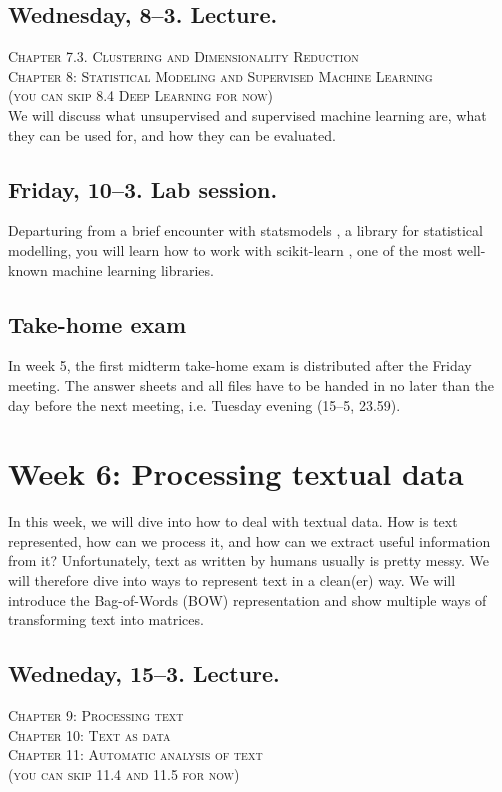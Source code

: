 \subsection*{Wednesday, 8--3. Lecture.}

\textsc{ Chapter 7.3. Clustering and Dimensionality Reduction}\\
\textsc{ Chapter 8: Statistical Modeling and Supervised Machine Learning}\\
\textsc{ (you can skip 8.4 Deep Learning for now)}\\

We will discuss what unsupervised and supervised machine learning are, what they can be used for, and how they can be evaluated.

\subsection*{Friday, 10--3. Lab session.}
Departuring from a brief encounter with statsmodels \citep{statsmodels}, a library for statistical modelling, you will learn how to work with scikit-learn \citep{scikit-learn}, one of the most well-known machine learning libraries.

\subsection*{Take-home exam}
In week 5, the first midterm take-home exam is distributed after the Friday meeting. The answer sheets and all files have to be handed in no later than the day before the next meeting, i.e. Tuesday evening (15--5, 23.59).





\section*{Week 6: Processing textual data}
In this week, we will dive into how to deal with textual data. How is text represented, how can we process it, and how can we extract useful information from it?
Unfortunately, text as written by humans usually is pretty messy.  We will therefore dive  into ways to represent text in a clean(er) way. We will introduce the Bag-of-Words (BOW) representation and show multiple ways of transforming text into matrices.


\subsection*{Wedneday, 15--3. Lecture.}
\textsc{ Chapter 9: Processing text}\\
\textsc{ Chapter 10: Text as data}\\
\textsc{ Chapter 11: Automatic analysis of text}\\
\textsc{ (you can skip 11.4 and 11.5 for now)}\\
  
